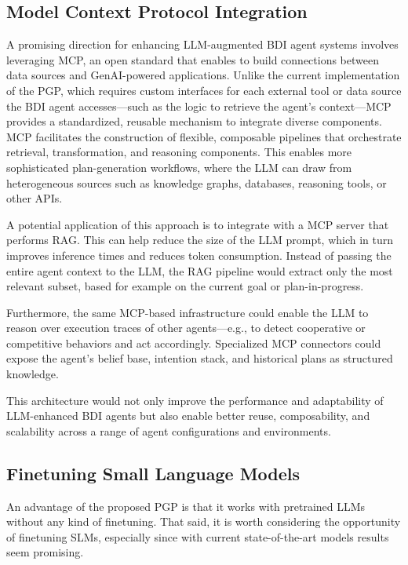 \documentclass[12pt,a4paper,openright,twoside]{book}
\begin{document}
\subsection{Model Context Protocol Integration}\label{sec:mcp-integration}

A promising direction for enhancing \ac{LLM}-augmented \ac{BDI} agent systems involves leveraging \ac{MCP}, an open standard that enables to build connections between data sources and GenAI-powered applications.
%
Unlike the current implementation of the \ac{PGP}, which requires custom interfaces for each external tool or data source the BDI agent accesses---such as the logic to retrieve the agent's context---\ac{MCP} provides a standardized, reusable mechanism to integrate diverse components.
%
\ac{MCP} facilitates the construction of flexible, composable pipelines that orchestrate retrieval, transformation, and reasoning components. 
%
This enables more sophisticated plan-generation workflows, where the \ac{LLM} can draw from heterogeneous sources such as knowledge graphs, databases, reasoning tools, or other APIs.

A potential application of this approach is to integrate with a \ac{MCP} server that performs \ac{RAG}. 
%
This can help reduce the size of the \ac{LLM} prompt, which in turn improves inference times and reduces token consumption. 
%
Instead of passing the entire agent context to the \ac{LLM}, the \ac{RAG} pipeline would extract only the most relevant subset, based for example on the current goal or plan-in-progress.

Furthermore, the same \ac{MCP}-based infrastructure could enable the \ac{LLM} to reason over execution traces of other agents---e.g., to detect cooperative or competitive behaviors and act accordingly. 
%
Specialized \ac{MCP} connectors could expose the agent's belief base, intention stack, and historical plans as structured knowledge.

This architecture would not only improve the performance and adaptability of \ac{LLM}-enhanced BDI agents but also enable better reuse, composability, and scalability across a range of agent configurations and environments.

\subsection{Finetuning Small Language Models}\label{sec:finetuning}

An advantage of the proposed PGP is that it works with pretrained LLMs without any kind of finetuning.
%
That said, it is worth considering the opportunity of finetuning \acp{SLM}, especially since with current state-of-the-art models results seem promising.
\end{document}
